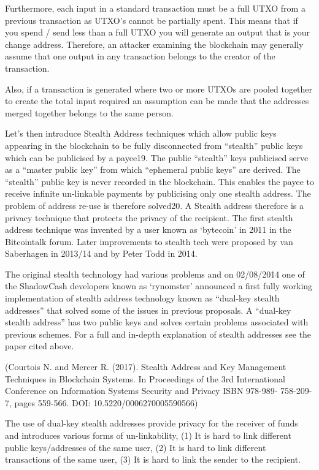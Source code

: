 Furthermore, each input in a standard transaction must be a full UTXO
from a previous transaction as UTXO’s cannot be partially spent. This
means that if you spend / send less than a full UTXO you will generate
an output that is your change address. Therefore, an attacker examining
the blockchain may generally assume that one output in any transaction
belongs to the creator of the transaction.



Also, if a transaction is generated where two or more UTXOs are pooled
together to create the total input required an assumption can be made
that the addresses merged together belongs to the same person.



Let’s then introduce Stealth Address techniques which allow public keys
appearing in the blockchain to be fully disconnected from “stealth” public
keys which can be publicised by a payee19. The public “stealth” keys
publicised serve as a “master public key” from which “ephemeral public
keys” are derived. The “stealth” public key is never recorded in the
blockchain. This enables the payee to receive infinite un-linkable
payments by publicising only one stealth address. The problem of address
re-use is therefore solved20. A Stealth address therefore is a privacy
technique that protects the privacy of the recipient. The first stealth
address technique was invented by a user known as ‘bytecoin’ in 2011 in
the Bitcointalk forum. Later improvements to stealth tech were proposed
by van Saberhagen in 2013/14 and by Peter Todd in 2014.



The original stealth technology had various problems and on 02/08/2014 one
of the ShadowCash developers known as ‘rynomster’ announced a first fully
working implementation of stealth address technology known as “dual-key
stealth addresses” that solved some of the issues in previous proposals.
A “dual-key stealth address” has two public keys and solves certain problems
associated with previous schemes. For a full and in-depth explanation of
stealth addresses see the paper cited above.



(Courtois N. and Mercer R. (2017). Stealth Address and Key Management
Techniques in Blockchain Systems. In Proceedings of the 3rd International
Conference on Information Systems Security and Privacy ISBN 978-989-
758-209-7, pages 559-566. DOI: 10.5220/0006270005590566)



The use of dual-key stealth addresses provide privacy for the receiver of
funds and introduces various forms of un-linkability, (1) It is hard to
link different public keys/addresses of the same user, (2) It is hard to
link different transactions of the same user, (3) It is hard to link the
sender to the recipient.